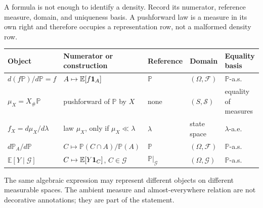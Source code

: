 A formula is not enough to identify a density. Record its numerator, reference measure, domain, and uniqueness basis. A pushforward law is a measure in its own right and therefore occupies a representation row, not a malformed density row.

{\footnotesize
{}
\begin{tabularx}{\textwidth}{@{}Y Y Y Y Y@{}}
\toprule
Object & Numerator or construction & Reference & Domain & Equality basis \\
\midrule
$d(f\mathbb P)/d\mathbb P=f$ & $A\mapsto\mathbb E[f\mathbf 1_A]$ & $\mathbb P$ & $(\Omega,\mathcal F)$ & $\mathbb P$-a.s. \\
$\mu_X=X_\#\mathbb P$ & pushforward of $\mathbb P$ by $X$ & none & $(S,\mathcal S)$ & equality of measures \\
$f_X=d\mu_X/d\lambda$ & law $\mu_X$, only if $\mu_X\ll\lambda$ & $\lambda$ & state space & $\lambda$-a.e. \\
$d\mathbb P_A/d\mathbb P$ & $C\mapsto\mathbb P(C\cap A)/\mathbb P(A)$ & $\mathbb P$ & $(\Omega,\mathcal F)$ & $\mathbb P$-a.s. \\
$\mathbb E[Y\mid\mathcal G]$ & $C\mapsto\mathbb E[Y\mathbf 1_C]$, $C\in\mathcal G$ & $\mathbb P|_{\mathcal G}$ & $(\Omega,\mathcal G)$ & $\mathbb P$-a.s. \\
\bottomrule
\end{tabularx}
\par
}

The same algebraic expression may represent different objects on different measurable spaces. The ambient measure and almost-everywhere relation are not decorative annotations; they are part of the statement.
